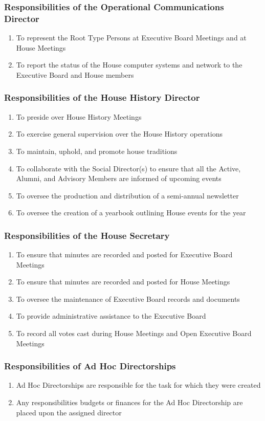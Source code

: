 \documentclass{article}
\newcommand{\asubsection}[1]{\subsubsection{#1} \label{#1}}
\begin{document}
\asubsection{Responsibilities of the Operational Communications Director}
\begin{enumerate}
	\item To represent the Root Type Persons at Executive Board Meetings and at House Meetings
	\item To report the status of the House computer systems and network to the Executive Board and House members
\end{enumerate}

\asubsection{Responsibilities of the House History Director}
\begin{enumerate}
	\item To preside over House History Meetings
	\item To exercise general supervision over the House History operations
	\item To maintain, uphold, and promote house traditions
	\item To collaborate with the Social Director(s) to ensure that all the Active, Alumni, and Advisory Members are informed of upcoming events
	\item To oversee the production and distribution of a semi-annual newsletter
	\item To oversee the creation of a yearbook outlining House events for the year
\end{enumerate}

\asubsection{Responsibilities of the House Secretary}
\begin{enumerate}
	\item To ensure that minutes are recorded and posted for Executive Board Meetings
	\item To ensure that minutes are recorded and posted for House Meetings
	\item To oversee the maintenance of Executive Board records and documents
	\item To provide administrative assistance to the Executive Board
	\item To record all votes cast during House Meetings and Open Executive Board Meetings
\end{enumerate}

\asubsection{Responsibilities of Ad Hoc Directorships}
\begin{enumerate}
	\item Ad Hoc Directorships are responsible for the task for which they were created
	\item Any responsibilities budgets or finances for the Ad Hoc Directorship are placed upon the assigned director
\end{enumerate}
\end{document}
